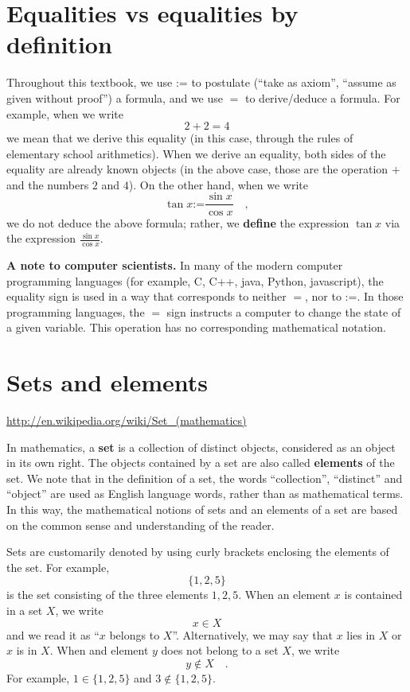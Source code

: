 \documentclass[12pt]{book}
\newcommand{\eqdef}{\textbf{:=}}
\renewcommand{\emph}{\textbf}
\begin{document}
\section{Equalities vs equalities by definition }
Throughout this textbook, we use $\eqdef$ to postulate (``take as axiom'', ``assume as given without proof'') a formula, and we use $=$ to derive/deduce a formula. For example, when we write 
\[ 2+2=4
\]
we mean that we derive this equality (in this case, through the rules of elementary school arithmetics). When we derive an equality, both sides of the equality are already known objects (in the above case, those are the operation $+$ and the numbers $2$ and $4$).  On the other hand, when we write 
\[
\tan x\eqdef\frac{\sin x}{\cos x}\quad ,
\]
we do not deduce the above formula; rather, we \emph{define} the expression $\tan x$ via the expression $\displaystyle\frac{\sin x}{\cos x}$.

\textbf{A note to computer scientists. } In many of the modern computer programming languages (for example, C, C++, java, Python, javascript), the equality sign is used in a way that corresponds to neither $=$, nor to $\eqdef$. In those programming languages, the $=$ sign instructs a computer to change the state of a given variable. This operation has no corresponding mathematical notation. 
\section{Sets and elements}
\url{http://en.wikipedia.org/wiki/Set_(mathematics)}

In mathematics, a \emph{set} is a collection of distinct objects, considered as an object in its own right. The objects contained by a set are also called \emph{elements} of the set. We note that in the definition of a set, the words ``collection'', ``distinct'' and ``object'' are used as English language words, rather than as mathematical terms. In this way, the mathematical notions of sets and an elements of a set are based on the common sense and understanding of the reader. 

Sets are customarily denoted by using curly brackets enclosing the elements of the set. For example,
\[
\{1,2,5\}
\]
is the set consisting of the three elements $1,2,5$. When an element $x$ is contained in a set $X$, we write 
\[
x\in X
\]
and we read it as ``$x$ belongs to $X$''. Alternatively, we may say that $x$ lies in $X$ or $x$ is in $X$. When and element $y$ does not belong to a set $X$, we write 
\[
y\notin X\quad. 
\]
For example, $1\in \{1,2,5\}$ and $3\notin \{1,2,5\}$.
\end{document}
